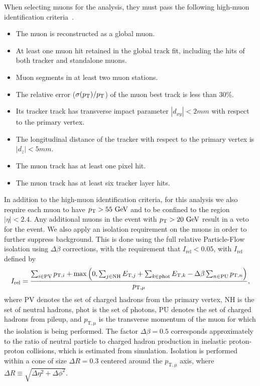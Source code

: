 When selecting muons for the analysis, they must pass the following high-\pt muon identification criteria~\cite{Sirunyan_2020}.
\begin{itemize}
  \item The muon is reconstructed as a global muon.
  \item At least one muon hit retained in the global track fit, including the hits of both tracker and standalone muons.
  \item Muon segments in at least two muon stations.
  \item The \pt relative error ($\sigma(\pt)/\pt$) of the muon best track is less than 30\%.
  \item Its tracker track has transverse impact parameter $|d_{xy}|<2\unit{mm}$ with respect to the primary vertex.
  \item The longitudinal distance of the tracker with respect to the primary vertex is $|d_z|<5\unit{mm}$.
  \item The muon track has at least one pixel hit.
  \item The muon track has at least six tracker layer hits.
\end{itemize}

In addition to the high-\pt muon identification criteria, for this analysis we also require each muon to have $\pt>55\unit{GeV}$ and to be confined to the region $|\eta|<2.4$.
Any additional muons in the event with $\pt>20\unit{GeV}$ result in a veto for the event.
We also apply an isolation requirement on the muons in order to further suppress background.
This is done using the full relative Particle-Flow isolation using $\Delta\beta$ corrections, with the requirement that $I_\mathrm{rel}<0.05$, with $I_\mathrm{rel}$ defined by~\cite{Sirunyan_pf}
\begin{equation}
  I_\mathrm{rel}=\frac{\sum_{i\in\mathrm{PV}}p_{\mathrm{T},i}+\max\pqty{0,\sum_{j\in\mathrm{NH}}E_{\mathrm{T},j}+\sum_{k\in\mathrm{phot}}E_{\mathrm{T},k}-\Delta\beta\sum_{n\in\mathrm{PU}}p_{\mathrm{T},n}}}{p_{\mathrm{T},\mu}},
\end{equation}
where $\mathrm{PV}$ denotes the set of charged hadrons from the primary vertex, $\mathrm{NH}$ is the set of neutral hadrons, $\mathrm{phot}$ is the set of photons, $\mathrm{PU}$ denotes the set of charged hadrons from pileup, and $p_\mathrm{T,\mu}$ is the transverse momentum of the muon for which the isolation is being performed.
The factor $\Delta\beta=0.5$ corresponds approximately to the ratio of neutral particle to charged hadron production in inelastic proton-proton collisions, which is estimated from simulation.
Isolation is performed within a cone of size $\Delta R=0.3$ centered around the $p_{\mathrm{T},\mu}$ axis, where $\Delta R\equiv\sqrt{\Delta\eta^2+\Delta\phi^2}$.

